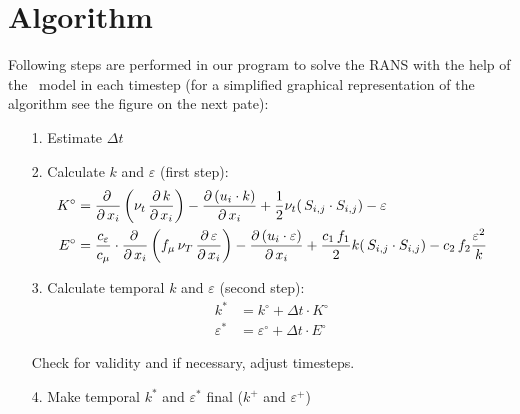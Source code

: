 \section*{Algorithm}
Following steps are performed in our program to solve the RANS with the help of the \ke\, model in each timestep (for a simplified graphical representation of the algorithm see the figure on the next pate):
\begin{itemize}
\item[1.] Estimate $\Delta t$
\item[2.] Calculate $k$ and $\varepsilon$ (first step):
\begin{align}\label{KK1}
K^\circ&=
\frac{\partial\,}{\partial\,x_i}\left(\nu_t\,\frac{\partial\,k}{\partial\,x_i}\right)
-
\frac{\partial\,(u_i\cdot k)}{\partial\,x_i}
+
\frac{1}{2}\nu_t
(\,S_{i,j} \cdot S_{i,j})
-
\varepsilon
\\\label{EE1}
E^\circ&=\frac{c_\varepsilon}{c_\mu}\cdot
\frac{\partial\,}{\partial\,x_i}\left(f_\mu\,\nu_T\,\frac{\partial\,\varepsilon}{\partial\,x_i}\right)
-
\frac{\partial\,(u_i\cdot \varepsilon)}{\partial\,x_i}
+
\frac{c_1\,f_1}{2}k
(\,S_{i,j} \cdot S_{i,j})
-
c_2\,f_2\frac{\varepsilon^2}{k}
\end{align}\vspace{-0.5cm}



\item[3.] Calculate temporal $k$ and $\varepsilon$ (second step):
\begin{align}
k^* &= k^\circ + \Delta t \cdot K^\circ\\
\varepsilon^* &= \varepsilon^\circ + \Delta t \cdot E^\circ
\end{align}\vspace{-0.5cm}

Check for validity and if necessary, adjust timesteps.

\item[4.] Make temporal $k^*$ and $\varepsilon^*$ final ($k^+$ and $\varepsilon^+$)


\end{itemize}
